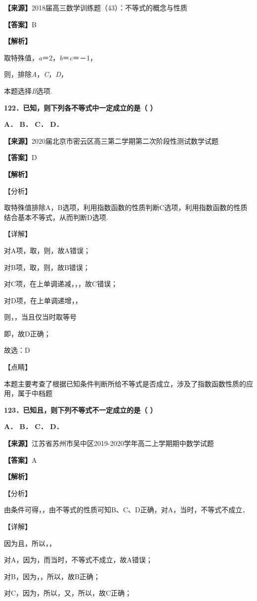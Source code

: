\textbf{【来源】}2018届高三数学训练题（43）：不等式的概念与性质

\textbf{【答案】}B

\textbf{【解析】}

取特殊值，\emph{a}＝2，\emph{b}＝\emph{c}＝－1，

则，排除\emph{A}，\emph{C}，\emph{D}，

本题选择\emph{B}选项.

\textbf{122．已知，则下列各不等式中一定成立的是（ ）}

\textbf{A． B． C． D．}

\textbf{【来源】}2020届北京市密云区高三第二学期第二次阶段性测试数学试题

\textbf{【答案】}D

\textbf{【解析】}

【分析】

取特殊值排除A，B选项，利用指数函数的性质判断C选项，利用指数函数的性质结合基本不等式，从而判断D选项.

【详解】

对A项，取，则，故A错误；

对B项，取，则，故B错误；

对C项，在上单调递减，，，故C错误；

对D项，在上单调递增，，

则，，当且仅当时取等号

即，故D正确；

故选：D

【点睛】

本题主要考查了根据已知条件判断所给不等式是否成立，涉及了指数函数性质的应用，属于中档题

\textbf{123．已知且，则下列不等式不一定成立的是（ ）}

\textbf{A． B． C． D．}

\textbf{【来源】}江苏省苏州市吴中区2019-2020学年高二上学期期中数学试题

\textbf{【答案】}A

\textbf{【解析】}

【分析】

由条件可得，，由不等式的性质可知B、C、D正确，对A，当时，不等式不成立．

【详解】

因为且，所以，，

对A，因为，而当时，不等式不成立，故A错误；

对B，因为，，所以，故B正确；

对C，因为，所以，又，所以，故C正确；

